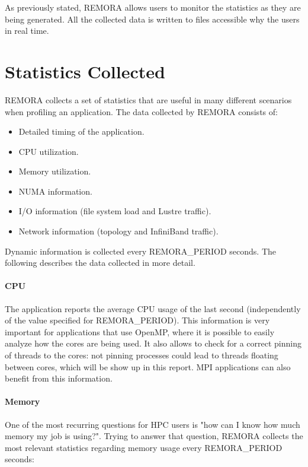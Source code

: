 \documentclass[10pt,a4paper]{report}
\begin{document}
As previously stated, REMORA allows users to monitor the statistics as they are being generated. All the collected data is written to files accessible why the users in real time.

\section{Statistics Collected}
REMORA collects a set of statistics that are useful in many different scenarios when profiling an application. The data collected by REMORA consists of:

\begin{itemize}
\item Detailed timing of the application.
\item CPU utilization.
\item Memory utilization.
\item NUMA information.
\item I/O information (file system load and Lustre traffic).
\item Network information (topology and InfiniBand traffic).
\end{itemize}

Dynamic information is collected every REMORA\_PERIOD seconds. The following describes the data collected in more detail. 

\paragraph{CPU}
The application reports the average CPU usage of the last second (independently of the value specified for REMORA\_PERIOD). This information is very important for applications that use OpenMP, where it is possible to easily analyze how the cores are being used. It also allows to check for a correct pinning of threads to the cores: not pinning processes could lead to threads floating between cores, which will be show up in this report. MPI applications can also benefit from this information.

\paragraph{Memory}
One of the most recurring questions for HPC users is "how can I know how much memory my job is using?". Trying to answer that question, REMORA collects the most relevant statistics regarding memory usage every REMORA\_PERIOD seconds:
\end{document}

